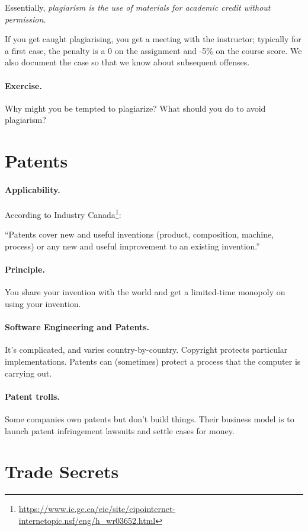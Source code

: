\documentclass[11pt]{article}
\begin{document}
Essentially, \emph{plagiarism is the use of materials for academic credit without permission.}

If you get caught plagiarising, you get a meeting with the instructor; typically for a first
case, the penalty is a 0 on the assignment and -5\% on the course score. We also document
the case so that we know about subsequent offenses.

\paragraph{Exercise.} Why might you be tempted to plagiarize? What should you do to avoid plagiarism?

\section*{Patents}

\paragraph{Applicability.} According to Industry Canada\footnote{\url{https://www.ic.gc.ca/eic/site/cipointernet-internetopic.nsf/eng/h_wr03652.html}}:

\noindent
``Patents cover new and useful inventions (product, composition, machine, process) or any new and useful improvement to an existing invention.''

\paragraph{Principle.} You share your invention with the world and get a limited-time monopoly on using your invention.

\paragraph{Software Engineering and Patents.} It's complicated, and varies country-by-country. Copyright protects particular implementations. Patents can (sometimes) protect a process that the computer is carrying out.

\paragraph{Patent trolls.} Some companies own patents but don't build things. Their business model
is to launch patent infringement lawsuits and settle cases for money.

\section*{Trade Secrets}
\end{document}
